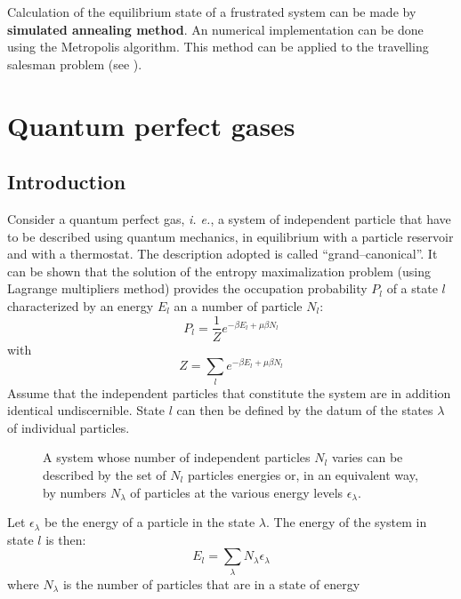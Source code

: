 \documentclass[12pt]{book}
\begin{document}
Calculation of the equilibrium state of a frustrated system can be made by
{\bf simulated annealing method}. An numerical
implementation can be done using the Metropolis algorithm.
This method can be applied to the travelling salesman problem (see
\cite{ma:compu:Press92}
).
\section{Quantum perfect gases}\label{secgasparfq}
\subsection{Introduction}
Consider a quantum perfect gas, {\it i. e.}, a system of independent particle
that have to be described using quantum mechanics,
in equilibrium with a particle reservoir \cite{ph:physt:Diu89} and with a
thermostat. The description adopted is called ``grand--canonical''. It can be
shown that the solution of the entropy maximalization problem (using Lagrange
multipliers method) provides the occupation probability $P_l$ of a state $l$
characterized by an energy $E_l$ an a number of particle $N_l$:
\begin{equation}
P_l=\frac{1}{Z}e^{-\beta E_l+\mu\beta N_l}
\end{equation}
with
\begin{equation}
Z=\sum_le^{-\beta E_l+\mu\beta N_l}
\end{equation}
Assume that the independent particles that constitute the system are in
addition identical undiscernible. State $l$ can then be defined by the datum
of the states $\lambda$ of individual particles. 
\begin{figure}[htb]
 \centerline{}   
 \caption{A system whose number of independent particles $N_l$ varies can be
   described by the set of $N_l$ particles energies or, in
   an equivalent way, by numbers $N_\lambda$ of particles at the various energy levels $\epsilon_\lambda$.}
 \label{figoccup}
\end{figure}
Let 
$\epsilon_\lambda$ be the energy of a particle in the state $\lambda$. The
energy of the system in state $l$ is then:
\begin{equation}
E_l=\sum_\lambda N_\lambda \epsilon_\lambda
\end{equation}
where $N_\lambda$ is the number of particles that are in a state of energy
\end{document}
